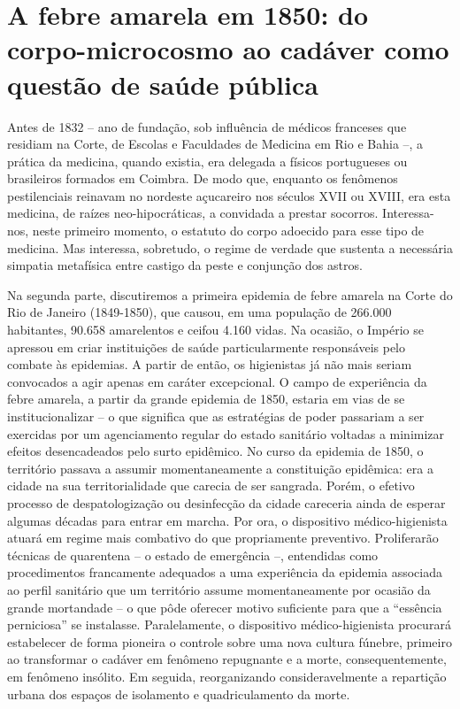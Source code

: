 \hypertarget{a-febre-amarela-em-1850-do-corpo-microcosmo-ao-caduxe1ver-como-questuxe3o-de-sauxfade-puxfablica}{%
\chapter{A febre amarela em 1850: do corpo-microcosmo ao cadáver como
questão de saúde
pública}\label{a-febre-amarela-em-1850-do-corpo-microcosmo-ao-caduxe1ver-como-questuxe3o-de-sauxfade-puxfablica}}

Antes de 1832 -- ano de fundação, sob influência de médicos franceses
que residiam na Corte, de Escolas e Faculdades de Medicina em Rio e
Bahia --, a prática da medicina, quando existia, era delegada a físicos
portugueses ou brasileiros formados em Coimbra. De modo que, enquanto os
fenômenos pestilenciais reinavam no nordeste açucareiro nos séculos XVII
ou XVIII, era esta medicina, de raízes neo-hipocráticas, a convidada a
prestar socorros. Interessa-nos, neste primeiro momento, o estatuto do
corpo adoecido para esse tipo de medicina. Mas interessa, sobretudo, o
regime de verdade que sustenta a necessária simpatia metafísica entre
castigo da peste e conjunção dos astros.

Na segunda parte, discutiremos a primeira epidemia de febre amarela na
Corte do Rio de Janeiro (1849-1850), que causou, em uma população de
266.000 habitantes, 90.658 amarelentos e ceifou 4.160 vidas. Na ocasião,
o Império se apressou em criar instituições de saúde particularmente
responsáveis pelo combate às epidemias. A partir de então, os
higienistas já não mais seriam convocados a agir apenas em caráter
excepcional. O campo de experiência da febre amarela, a partir da grande
epidemia de 1850, estaria em vias de se institucionalizar -- o que
significa que as estratégias de poder passariam a ser exercidas por um
agenciamento regular do estado sanitário voltadas a minimizar efeitos
desencadeados pelo surto epidêmico. No curso da epidemia de 1850, o
território passava a assumir momentaneamente a constituição epidêmica:
era a cidade na sua territorialidade que carecia de ser sangrada. Porém,
o efetivo processo de despatologização ou desinfecção da cidade
careceria ainda de esperar algumas décadas para entrar em marcha. Por
ora, o dispositivo médico-higienista atuará em regime mais combativo do
que propriamente preventivo. Proliferarão técnicas de quarentena -- o
estado de emergência --, entendidas como procedimentos francamente
adequados a uma experiência da epidemia associada ao perfil sanitário
que um território assume momentaneamente por ocasião da grande
mortandade -- o que pôde oferecer motivo suficiente para que a
``essência perniciosa'' se instalasse. Paralelamente, o dispositivo
médico-higienista procurará estabelecer de forma pioneira o controle
sobre uma nova cultura fúnebre, primeiro ao transformar o cadáver em
fenômeno repugnante e a morte, consequentemente, em fenômeno insólito.
Em seguida, reorganizando consideravelmente a repartição urbana dos
espaços de isolamento e quadriculamento da morte.


